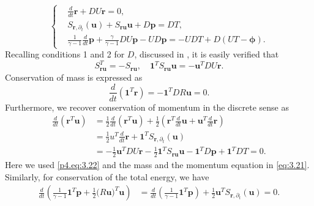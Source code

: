 \begin{equation} \label{p4.eq:3.21}
\left\{
\begin{aligned}
	& \frac{d}{dt} \mathbf r + DU\mathbf r = 0, \\
	& S_{\mathbf r,\partial_t} (\mathbf u) + S_{\mathbf r \mathbf u} \mathbf u + D \mathbf p = D T, \\
	&\frac{1}{\gamma -1} \frac{d}{dt} \mathbf p + \frac{\gamma}{\gamma -1} D U \mathbf p - UD\mathbf p = - UDT + D(UT - \mathbf \phi).
\end{aligned}
\right.
\end{equation}
Recalling conditions 1 and 2 for $D$, discussed in , it is easily verified that
\begin{equation} \label{p4.eq:3.22}
	S_{\mathbf r \mathbf u}^T = - S_{\mathbf r \mathbf u}, \quad \mathbf 1^T S_{\mathbf r \mathbf u} \mathbf u = - \mathbf u^T DU \mathbf r.
\end{equation}
Conservation of mass is expressed as
\begin{equation} \label{p4.eq:3.23}
	\frac{d}{dt} (\mathbf 1^T \mathbf r) = - \mathbf 1^T DR\mathbf u = 0. 
\end{equation}
Furthermore, we recover conservation of momentum in the discrete sense as
\begin{equation} \label{p4.eq:3.24}
\begin{aligned}
	\frac{d}{dt}(\mathbf r^T \mathbf u) &= \frac{1}{2} \frac{d}{dt}(\mathbf r^T \mathbf u) + \frac{1}{2} \left( \mathbf r^T \frac d{dt} \mathbf u +\mathbf u^T \frac{d}{dt} \mathbf r \right)\\
	&= \frac{1}{2}u^T \frac d{dt} \mathbf r + \mathbf 1^T S_{\mathbf r,\partial_t} (\mathbf u) \\
	&= -\frac 1 2 \mathbf u^T DU \mathbf r  - \frac 1 2 \mathbf 1^T S_{\mathbf r \mathbf u} \mathbf u - \mathbf 1^T D\mathbf p +  \mathbf 1^T D T = 0.
\end{aligned}
\end{equation}
Here we used \eqref{p4.eq:3.22} and the mass and the momentum equation in \eqref{eq:3.21}. Similarly, for conservation of the total energy, we have
\begin{equation} \label{p4.eq:3.25}
\begin{aligned}
	\frac{d}{dt} \left( \frac{1}{\gamma - 1} \mathbf 1^T \mathbf p + \frac 1 2 \mathbf (R\mathbf u)^T \mathbf u  \right) &= \frac{d}{dt} \left( \frac{1}{\gamma - 1} \mathbf 1^T \mathbf p \right) + \frac 1 2 \mathbf u^T  S_{\mathbf r,\partial_t} (\mathbf u) = 0.
\end{aligned}
\end{equation}

